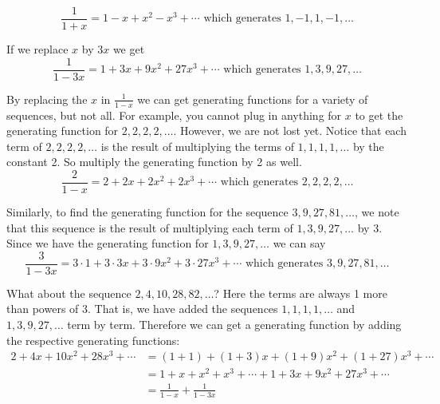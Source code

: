 \documentclass[10pt,]{book}
\theoremstyle{plain}
\theoremstyle{definition}
\theoremstyle{definition}
\theoremstyle{definition}
\theoremstyle{definition}
\numberwithin{equation}{chapter}
\newcommand{\amp}{&}
\begin{document}
\begin{equation*}
\frac{1}{1+x} = 1 - x + x^2 - x^3 + \cdots \mbox{ which generates }  1, -1, 1, -1, \ldots
\end{equation*}
%
\par
\hypertarget{p-966}{}%
If we replace \(x\) by \(3x\) we get%
\begin{equation*}
\frac{1}{1-3x} = 1 + 3x + 9x^2 + 27x^3 + \cdots \mbox{ which generates }  1, 3, 9, 27, \ldots
\end{equation*}
%
\par
\hypertarget{p-967}{}%
By replacing the \(x\) in \(\frac{1}{1-x}\) we can get generating functions for a variety of sequences, but not all. For example, you cannot plug in anything for \(x\) to get the generating function for \(2,2,2,2, \ldots\). However, we are not lost yet. Notice that each term of \(2, 2, 2, 2, \ldots\) is the result of multiplying the terms of \(1, 1, 1, 1, \ldots\) by the constant 2. So multiply the generating function by 2 as well.%
\begin{equation*}
\frac{2}{1-x} = 2 + 2x + 2x^2 + 2x^3 + \cdots \mbox{ which generates }  2, 2, 2, 2, \ldots
\end{equation*}
%
\par
\hypertarget{p-968}{}%
Similarly, to find the generating function for the sequence \(3, 9, 27, 81, \ldots\), we note that this sequence is the result of multiplying each term of \(1, 3, 9, 27, \ldots\) by 3. Since we have the generating function for \(1, 3, 9, 27, \ldots\) we can say%
\begin{equation*}
\frac{3}{1-3x} = 3\cdot 1 + 3\cdot 3x + 3\cdot 9x^2 + 3\cdot 27x^3 + \cdots \mbox{ which generates }  3, 9, 27, 81, \ldots
\end{equation*}
%
\par
\hypertarget{p-969}{}%
What about the sequence \(2, 4, 10, 28, 82, \ldots\)? Here the terms are always 1 more than powers of 3. That is, we have added the sequences \(1,1,1,1,\ldots\) and \(1,3,9, 27,\ldots\) term by term. Therefore we can get a generating function by adding the respective generating functions:%
\begin{align*}
2 + 4x + 10x^2 + 28x^3 + \cdots  \amp  = (1 + 1) + (1 + 3)x + (1 + 9)x^2 + (1 + 27)x^3 + \cdots\\
\amp  = 1 + x + x^2 + x^3 + \cdots + 1 + 3x + 9x^2 + 27x^3 + \cdots\\
\amp  = \frac{1}{1-x} + \frac{1}{1-3x}
\end{align*}
%
\par
\end{document}
